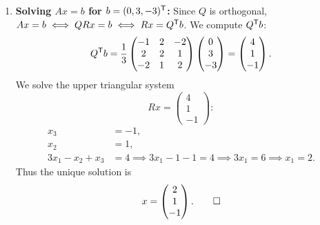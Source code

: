 \begin{exercisesolution*}
\begin{enumerate}[label=\textbf{(\alph*)}]
\begin{itemize}
\[        \]
        \[
        R_{33} = \|w_3\| = \frac{1}{3}\sqrt{4 + 1 + 4} = 1 \implies e_3 = \frac{1}{3}\begin{pmatrix} -2 \\ 1 \\ 2 \end{pmatrix}.
        \]
    \end{itemize}
    Thus the $QR$-decomposition is:
    \[
    Q = \frac{1}{3}\begin{pmatrix} -1 & 2 & -2 \\ 2 & 2 & 1 \\ -2 & 1 & 2 \end{pmatrix}, \qquad
    R = \begin{pmatrix} 3 & -1 & 1 \\ 0 & 1 & 0 \\ 0 & 0 & 1 \end{pmatrix}.
    \]

    \item \textbf{Solving $Ax = b$ for $b = (0, 3, -3)^{\mathsf{T}}$:}
    Since $Q$ is orthogonal, $Ax = b \iff QRx = b \iff Rx = Q^{\mathsf{T}} b$.
    We compute $Q^{\mathsf{T}} b$:
    \[
    Q^{\mathsf{T}} b = \frac{1}{3}\begin{pmatrix} -1 & 2 & -2 \\ 2 & 2 & 1 \\ -2 & 1 & 2 \end{pmatrix} \begin{pmatrix} 0 \\ 3 \\ -3 \end{pmatrix} = \begin{pmatrix} 4 \\ 1 \\ -1 \end{pmatrix}.
    \]
    We solve the upper triangular system
    \[
    Rx = \begin{pmatrix} 4 \\ 1 \\ -1 \end{pmatrix}:
    \]
    \begin{align*}
    x_3 &= -1, \\
    x_2 &= 1, \\
    3x_1 - x_2 + x_3 &= 4 \implies 3x_1 - 1 - 1 = 4 \implies 3x_1 = 6 \implies x_1 = 2.
    \end{align*}
    Thus the unique solution is
    \[
    x = \begin{pmatrix} 2 \\ 1 \\ -1 \end{pmatrix}. \qedhere
    \]
\end{enumerate}
\end{exercisesolution*}

